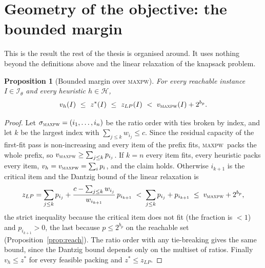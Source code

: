\documentclass[a4paper,11pt]{article}
\newcommand{\bp}{b_{p}}
\newcommand{\inst}{\mathcal{I}}
\newcommand{\heur}{\mathcal{H}}
\newcommand{\MAXPW}{\textsc{maxpw}}
\theoremstyle{plain}
\newtheorem{proposition}{Proposition}
\theoremstyle{definition}
\theoremstyle{remark}
\begin{document}
\section{Geometry of the objective: the bounded margin}\label{sec:bound}

This is the result the rest of the thesis is organised around. It uses nothing beyond the
definitions above and the linear relaxation of the knapsack problem.

\begin{proposition}[Bounded margin over \MAXPW]\label{prop:bound}
For every reachable instance $I\in\inst_\theta$ and every heuristic $h\in\heur$,
\[
v_h(I)\ \le\ z^{*}(I)\ \le\ z_{LP}(I)\ <\ v_{\MAXPW}(I)+2^{\bp}.
\]
\end{proposition}

\begin{proof}
Let $\sigma_{\MAXPW}=(i_1,\dots,i_n)$ be the ratio order with ties broken by index, and let
$k$ be the largest index with $\sum_{j\le k}w_{i_j}\le c$. Since the residual capacity of
the first-fit pass is non-increasing and every item of the prefix fits, \MAXPW\ packs the
whole prefix, so $v_{\MAXPW}\ge\sum_{j\le k}p_{i_j}$. If $k=n$ every item fits, every
heuristic packs every item, $v_h=v_{\MAXPW}=\sum_ip_i$, and the claim holds. Otherwise
$i_{k+1}$ is the critical item and the Dantzig bound of the linear relaxation is
\[
z_{LP}=\sum_{j\le k}p_{i_j}+\frac{c-\sum_{j\le k}w_{i_j}}{w_{i_{k+1}}}\,p_{i_{k+1}}
\;<\;\sum_{j\le k}p_{i_j}+p_{i_{k+1}}\;\le\;v_{\MAXPW}+2^{\bp},
\]
the strict inequality because the critical item does not fit (the fraction is $<1$) and
$p_{i_{k+1}}>0$, the last because $p\le2^{\bp}$ on the reachable set
(Proposition~\ref{prop:reach}). The ratio order with any tie-breaking gives the same bound,
since the Dantzig bound depends only on the multiset of ratios. Finally $v_h\le z^{*}$ for
every feasible packing and $z^{*}\le z_{LP}$.
\end{proof}
\end{document}
